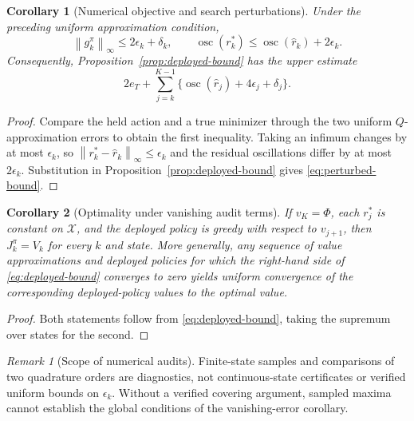 \documentclass[preprint,11pt]{elsarticle}
\newcommand{\cX}{\mathcal{X}}
\newcommand{\osc}{\operatorname{osc}}
\newcommand{\norm}[1]{\left\lVert #1\right\rVert}
\theoremstyle{plain}
\newtheorem{corollary}{Corollary}
\theoremstyle{remark}
\newtheorem{remark}{Remark}
\begin{document}
\begin{corollary}[Numerical objective and search perturbations]
\label{cor:q-perturbation}
Under the preceding uniform approximation condition,
\begin{equation}
 \norm{g_k^\pi}_\infty\leq2\epsilon_k+\delta_k,
 \qquad
 \osc(r_k^*)\leq\osc(\widehat r_k)+2\epsilon_k.
\end{equation}
Consequently, Proposition~\ref{prop:deployed-bound} has the upper estimate
\begin{equation}
 2e_T+\sum_{j=k}^{K-1}
 \{\osc(\widehat r_j)+4\epsilon_j+\delta_j\}.
 \label{eq:perturbed-bound}
\end{equation}
\end{corollary}

\begin{proof}
Compare the held action and a true minimizer through the two uniform
$Q$-approximation errors to obtain the first inequality. Taking an infimum
changes by at most $\epsilon_k$, so
$\norm{r_k^*-\widehat r_k}_\infty\leq\epsilon_k$ and the residual
oscillations differ by at most $2\epsilon_k$. Substitution in
Proposition~\ref{prop:deployed-bound} gives \eqref{eq:perturbed-bound}.
\end{proof}

\begin{corollary}[Optimality under vanishing audit terms]
If $v_K=\Phi$, each $r_j^*$ is constant on $\cX$, and the deployed policy is
greedy with respect to $v_{j+1}$, then $J_k^\pi=V_k$ for every $k$ and state.
More generally, any sequence of value approximations and deployed policies for
which the right-hand side of \eqref{eq:deployed-bound} converges to zero yields
uniform convergence of the corresponding deployed-policy values to the
optimal value.
\end{corollary}

\begin{proof}
Both statements follow from \eqref{eq:deployed-bound}, taking the supremum
over states for the second.
\end{proof}

\begin{remark}[Scope of numerical audits]
Finite-state samples and comparisons of two quadrature orders are diagnostics,
not continuous-state certificates or verified uniform bounds on $\epsilon_k$.
Without a verified covering argument, sampled maxima cannot establish the
global conditions of the vanishing-error corollary.
\end{remark}
\end{document}
